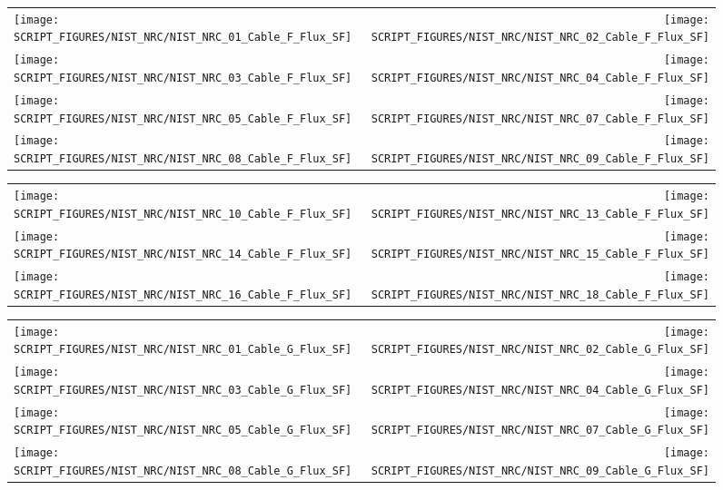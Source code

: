 \begin{figure}[p]
\begin{tabular*}{\textwidth}{l@{\extracolsep{\fill}}r}
\texttt{[image: SCRIPT\_FIGURES/NIST\_NRC/NIST\_NRC\_01\_Cable\_F\_Flux\_SF]} &
\texttt{[image: SCRIPT\_FIGURES/NIST\_NRC/NIST\_NRC\_02\_Cable\_F\_Flux\_SF]} \\
\texttt{[image: SCRIPT\_FIGURES/NIST\_NRC/NIST\_NRC\_03\_Cable\_F\_Flux\_SF]} &
\texttt{[image: SCRIPT\_FIGURES/NIST\_NRC/NIST\_NRC\_04\_Cable\_F\_Flux\_SF]} \\
\texttt{[image: SCRIPT\_FIGURES/NIST\_NRC/NIST\_NRC\_05\_Cable\_F\_Flux\_SF]} &
\texttt{[image: SCRIPT\_FIGURES/NIST\_NRC/NIST\_NRC\_07\_Cable\_F\_Flux\_SF]} \\
\texttt{[image: SCRIPT\_FIGURES/NIST\_NRC/NIST\_NRC\_08\_Cable\_F\_Flux\_SF]} &
\texttt{[image: SCRIPT\_FIGURES/NIST\_NRC/NIST\_NRC\_09\_Cable\_F\_Flux\_SF]}
\end{tabular*}
\end{figure}

\begin{figure}[p]
\begin{tabular*}{\textwidth}{l@{\extracolsep{\fill}}r}
\texttt{[image: SCRIPT\_FIGURES/NIST\_NRC/NIST\_NRC\_10\_Cable\_F\_Flux\_SF]} &
\texttt{[image: SCRIPT\_FIGURES/NIST\_NRC/NIST\_NRC\_13\_Cable\_F\_Flux\_SF]} \\
\texttt{[image: SCRIPT\_FIGURES/NIST\_NRC/NIST\_NRC\_14\_Cable\_F\_Flux\_SF]} &
\texttt{[image: SCRIPT\_FIGURES/NIST\_NRC/NIST\_NRC\_15\_Cable\_F\_Flux\_SF]} \\
\texttt{[image: SCRIPT\_FIGURES/NIST\_NRC/NIST\_NRC\_16\_Cable\_F\_Flux\_SF]} &
\texttt{[image: SCRIPT\_FIGURES/NIST\_NRC/NIST\_NRC\_18\_Cable\_F\_Flux\_SF]}
\end{tabular*}
\end{figure}

\begin{figure}[p]
\begin{tabular*}{\textwidth}{l@{\extracolsep{\fill}}r}
\texttt{[image: SCRIPT\_FIGURES/NIST\_NRC/NIST\_NRC\_01\_Cable\_G\_Flux\_SF]} &
\texttt{[image: SCRIPT\_FIGURES/NIST\_NRC/NIST\_NRC\_02\_Cable\_G\_Flux\_SF]} \\
\texttt{[image: SCRIPT\_FIGURES/NIST\_NRC/NIST\_NRC\_03\_Cable\_G\_Flux\_SF]} &
\texttt{[image: SCRIPT\_FIGURES/NIST\_NRC/NIST\_NRC\_04\_Cable\_G\_Flux\_SF]} \\
\texttt{[image: SCRIPT\_FIGURES/NIST\_NRC/NIST\_NRC\_05\_Cable\_G\_Flux\_SF]} &
\texttt{[image: SCRIPT\_FIGURES/NIST\_NRC/NIST\_NRC\_07\_Cable\_G\_Flux\_SF]} \\
\texttt{[image: SCRIPT\_FIGURES/NIST\_NRC/NIST\_NRC\_08\_Cable\_G\_Flux\_SF]} &
\texttt{[image: SCRIPT\_FIGURES/NIST\_NRC/NIST\_NRC\_09\_Cable\_G\_Flux\_SF]}
\end{tabular*}
\end{figure}

